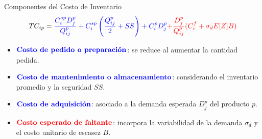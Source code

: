 \documentclass[
  ignorenonframetext,
]{beamer}
\providecommand{\tightlist}{%
  \setlength{\itemsep}{0pt}\setlength{\parskip}{0pt}}
\begin{document}
\begin{frame}{Componentes del Costo de Inventario}
\label{componentes-del-costo-de-inventario}
\[
TC_{ip} =
{\color{blue}\frac{C^{op}_i D^p_j}{Q^p_{ij}} +
C^{sp}_i \left(\frac{Q^p_{ij}}{2} + SS\right) +
C^p_i D^p_j} {\color{red}+
\frac{D^p_j}{Q^p_{ij}} (C^f_i + \sigma_d E[Z] B)}
\]

\begin{itemize}
\tightlist
\item
  \({\textcolor{blue}{\textbf{Costo de pedido o preparación}}}\): se
  reduce al aumentar la cantidad pedida.\\
\item
  \({\textcolor{blue}{\textbf{Costo de mantenimiento o almacenamiento}}}\):
  considerando el inventario promedio y la seguridad \(SS\).\\
\item
  \({\textcolor{blue}{\textbf{Costo de adquisición}}}\): asociado a la
  demanda esperada \(D^p_j\) del producto \(p\).\\
\item
  \({\textcolor{red}{\textbf{Costo esperado de faltante}}}\): incorpora
  la variabilidad de la demanda \(\sigma_d\) y el costo unitario de
  escasez \(B\).
\end{itemize}
\end{frame}
\end{document}
